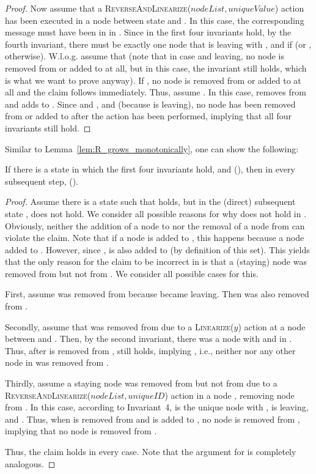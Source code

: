 \documentclass[a4paper,USenglish]{lipics}
\newcommand{\linearize}[1]{\textsc{Linearize(\ensuremath{#1})}\xspace}
\newcommand{\revandlin}[1]{\textsc{ReverseAndLinearize(\ensuremath{#1})}\xspace} \newcommand{\revandlinREQ}[1]{\textsc{ReverseAndLinearizeREQ(#1)}\xspace}
\begin{document}
\begin{proof}
    Now assume that a \revandlin{nodeList, uniqueValue} action has been executed in a node  between state  and .
    In this case, the corresponding message must have been in  in .
 Since in  the first four invariants hold, by the fourth invariant, there must be exactly one node  that is leaving with , and  if  (or , otherwise).
 W.l.o.g. assume that  (note that in case  and  leaving, no node is removed from or added to  at all, but in this case, the invariant still holds, which is what we want to prove anyway).
 If , no node is removed from or added to  at all and the claim follows immediately.
 Thus, assume .
 In this case,  removes  from  and adds  to .
 Since  and , and  (because  is leaving), no node has been removed from or added to  after the action has been performed, implying that all four invariants still hold.  
\end{proof}
Similar to Lemma~\ref{lem:R_grows_monotonically}, one can show the following:
\begin{lemma}\label{lem:blpp_Rs_grows_monotonically}
  If there is a state in which the first four invariants hold, and  (), then in every subsequent step,  ().
\end{lemma}
\begin{proof}
Assume there is a state  such that  holds, but in the (direct) subsequent state ,  does not hold.
We consider all possible reasons for why  does not hold in .
Obviously, neither the addition of a node to  nor the removal of a node from  can violate the claim.
Note that if a node  is added to , this happens because a node  added  to .
However, since ,  is also added to  (by definition of this set).
This yields that the only reason for the claim to be incorrect in  is that a (staying) node  was removed from  but not from .
We consider all possible cases for this.

First, assume  was removed from  because  became leaving.
Then  was also removed from .

Secondly, assume that  was removed from  due to a \linearize{y} action at a node  between  and .
Then, by the second invariant, there was a node  with  and  in .
Thus, after  is removed from ,  still holds, implying , i.e., neither  nor any other node  in  was removed from .

Thirdly, assume a staying node  was removed from  but not from  due to a \revandlin{nodeList,uniqueID} action in a node , removing node  from .
In this case, according to Invariant~4,  is the unique node with ,  is leaving, and .
Thus, when  is removed from  and  is added to , no node is removed from , implying that no node is removed from .

Thus, the claim holds in every case.
Note that the argument for  is completely analogous.
\end{proof}
\end{document}
